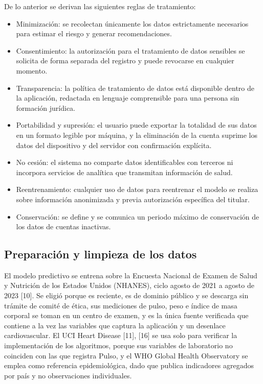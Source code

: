 \documentclass[conference]{IEEEtran}
\begin{document}
De lo anterior se derivan las siguientes reglas de tratamiento:

\begin{itemize}
\item Minimización: se recolectan únicamente los datos estrictamente necesarios para estimar el riesgo y generar recomendaciones.
\item Consentimiento: la autorización para el tratamiento de datos sensibles se solicita de forma separada del registro y puede revocarse en cualquier momento.
\item Transparencia: la política de tratamiento de datos está disponible dentro de la aplicación, redactada en lenguaje comprensible para una persona sin formación jurídica.
\item Portabilidad y supresión: el usuario puede exportar la totalidad de sus datos en un formato legible por máquina, y la eliminación de la cuenta suprime los datos del dispositivo y del servidor con confirmación explícita.
\item No cesión: el sistema no comparte datos identificables con terceros ni incorpora servicios de analítica que transmitan información de salud.
\item Reentrenamiento: cualquier uso de datos para reentrenar el modelo se realiza sobre información anonimizada y previa autorización específica del titular.
\item Conservación: se define y se comunica un periodo máximo de conservación de los datos de cuentas inactivas.
\end{itemize}
\subsection{Preparación y limpieza de los datos}
El modelo predictivo se entrena sobre la Encuesta Nacional de Examen de Salud y Nutrición de los Estados Unidos (NHANES), ciclo agosto de 2021 a agosto de 2023 [10]. Se eligió porque es reciente, es de dominio público y se descarga sin trámite de comité de ética, sus mediciones de pulso, peso e índice de masa corporal se toman en un centro de examen, y es la única fuente verificada que contiene a la vez las variables que captura la aplicación y un desenlace cardiovascular. El UCI Heart Disease [11], [16] se usa solo para verificar la implementación de los algoritmos, porque sus variables de laboratorio no coinciden con las que registra Pulso, y el WHO Global Health Observatory se emplea como referencia epidemiológica, dado que publica indicadores agregados por país y no observaciones individuales.
\end{document}
